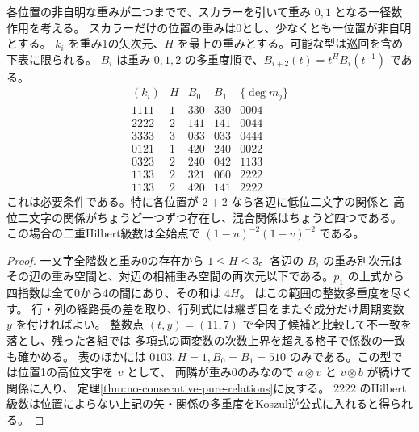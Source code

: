 \begin{corollary}\label{cor:two-weight-profiles}
各位置の非自明な重みが二つまでで、スカラーを引いて重み $0,1$ となる一径数作用を考える。
スカラーだけの位置の重みは0とし、少なくとも一位置が非自明とする。
$k_i$ を重み1の矢次元、$H$ を最上の重みとする。可能な型は巡回を含め下表に限られる。
$B_i$ は重み $0,1,2$ の多重度順で、$B_{i+2}(t)=t^HB_i(t^{-1})$ である。
\[
\begin{array}{c|c|cc|c}
 (k_i)&H&B_0&B_1&\{\deg m_j\}\\ \hline
 1111&1&330&330&0004\\
 2222&2&141&141&0044\\
 3333&3&033&033&0444\\
 0121&1&420&240&0022\\
 0323&2&240&042&1133\\
 1133&2&321&060&2222\\
 1133&2&420&141&2222
\end{array}
\]
これは必要条件である。特に各位置が $2+2$ なら各辺に低位二文字の関係と
高位二文字の関係がちょうど一つずつ存在し、混合関係はちょうど四つである。
この場合の二重Hilbert級数は全始点で $(1-u)^{-2}(1-v)^{-2}$ である。
\end{corollary}
\begin{proof}
一文字全階数と重み0の存在から $1\le H\le3$。各辺の $B_i$ の重み別次元は
その辺の重み空間と、対辺の相補重み空間の両次元以下である。$p_1$ の上式から
四指数は全て0から4の間にあり、その和は $4H$。
 はこの範囲の整数多重度を尽くす。
行・列の経路長の差を取り、行列式には継ぎ目をまたぐ成分だけ周期変数 $y$ を付ければよい。
整数点 $(t,y)=(11,7)$ で全因子候補と比較して不一致を落とし、残った各組では
多項式の両変数の次数上界を超える格子で係数の一致も確かめる。
表のほかには $0103,H=1,B_0=B_1=510$ のみである。この型では位置1の高位文字を $v$ として、
両隣が重み0のみなので $a\otimes v$ と $v\otimes b$ が続けて関係に入り、
定理\ref{thm:no-consecutive-pure-relations}に反する。
$2222$ のHilbert級数は位置によらない上記の矢・関係の多重度をKoszul逆公式に入れると得られる。
\end{proof}
